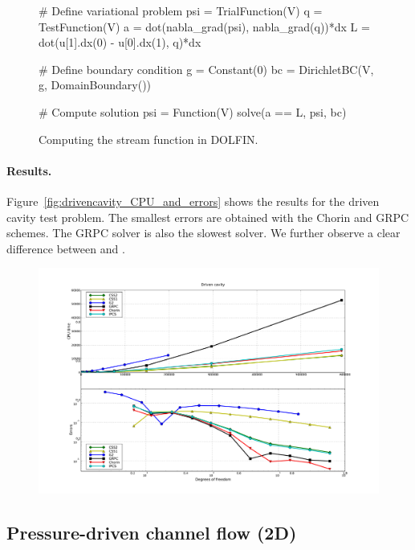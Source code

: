 \begin{figure}
\bwfig
    \begin{python}
# Define variational problem
psi = TrialFunction(V)
q   = TestFunction(V)
a   = dot(nabla_grad(psi), nabla_grad(q))*dx
L   = dot(u[1].dx(0) - u[0].dx(1), q)*dx

# Define boundary condition
g  = Constant(0)
bc = DirichletBC(V, g, DomainBoundary())

# Compute solution
psi = Function(V)
solve(a == L, psi, bc)
    \end{python}
    \caption{Computing the stream function in DOLFIN.}
    \label{fig:streamfunction}
\end{figure}

\paragraph{Results.}

Figure~\ref{fig:drivencavity_CPU_and_errors} shows the results for the
driven cavity test problem.  The smallest errors are obtained with the
Chorin and GRPC schemes. The GRPC solver is also the slowest
solver. We further observe a clear difference between  and
.

\begin{figure}
          {\includegraphics[width=\fullfig]{chapters/kvs-1/pdf/new_drivencavity_res.pdf}}
\end{figure}

\subsection{Pressure-driven channel flow (2D)}

